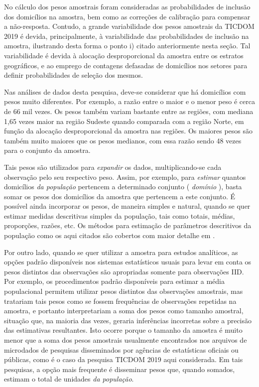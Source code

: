 \documentclass[
]{book}
\begin{document}
No cálculo dos pesos amostrais foram consideradas as probabilidades de inclusão dos domicílios na amostra, bem como as correções de calibração para compensar a
não-resposta. Contudo, a grande variabilidade dos pesos amostrais da TICDOM 2019
é devida, principalmente, à variabilidade das probabilidades de inclusão na
amostra, ilustrando desta forma o ponto i) citado anteriormente nesta seção.
Tal variabilidade é devida à alocação desproporcional da amostra entre os estratos geográficos, e ao emprego de contagens defasadas de domicílios nos setores para definir probabilidades de seleção dos mesmos.

Nas análises de dados desta pesquisa, deve-se considerar que há domicílios com pesos muito diferentes. Por exemplo, a razão entre o maior e o menor peso é cerca de 66 mil vezes. Os pesos também variam bastante entre as regiões, com mediana 1,65 vezes maior na região Sudeste quando comparada com a região Norte, em função da alocação desproporcional da amostra nas regiões. Os maiores pesos são também muito maiores que os pesos medianos, com essa razão sendo 48 vezes para o conjunto da amostra.

Tais pesos são utilizados para \emph{expandir} os dados, multiplicando-se cada observação pelo seu respectivo peso. Assim, por exemplo, para \emph{estimar}
quantos domicílios \emph{da população} pertencem a determinado conjunto ( \emph{domínio} ), basta somar os pesos dos domicílios da amostra que pertencem a este conjunto. É possível ainda incorporar os pesos, de maneira simples e natural, quando
se quer estimar medidas descritivas simples da população, tais como totais, médias, proporções, razões, etc. Os métodos para estimação de parâmetros descritivos da população como os aqui citados são cobertos com maior detalhe em \citep{Silva2020}.

Por outro lado, quando se quer utilizar a amostra para estudos analíticos, as
opções padrão disponíveis nos sistemas estatísticos usuais para levar em conta os pesos distintos das observações são apropriadas somente para observações IID. Por exemplo, os procedimentos padrão disponíveis para estimar a média populacional permitem utilizar pesos distintos das observações amostrais,
mas tratariam tais pesos como se fossem frequências de observações repetidas na amostra, e portanto interpretariam a soma dos pesos como tamanho amostral, situação que, na maioria das vezes, geraria inferências incorretas sobre a precisão das estimativas resultantes. Isto ocorre porque o tamanho da amostra é muito menor que a soma dos pesos amostrais usualmente encontrados nos arquivos de microdados de pesquisas disseminados por agências de estatísticas oficiais ou públicas, como é o caso da pesquisa TICDOM 2019 aqui considerada. Em tais pesquisas, a opção mais frequente é disseminar pesos que, quando somados, estimam o total de unidades \emph{da população}.
\end{document}
